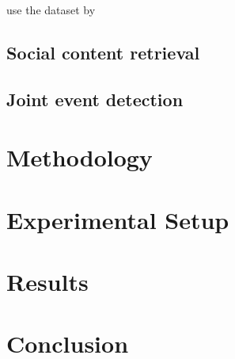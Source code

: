 \cite{zhao_interactive_2019} use the dataset by \cite{guo_linking_2013}
\subsection{Social content retrieval}
\label{Social content retrieval}
\cite{suarez2018data}

\cite{ning_uncovering_2015}

\cite{tanev_enhancing_2012}

\cite{tsagkias_linking_2011}

\cite{danovitch2020linking}

\cite{wang_mining_2015}
\subsection{Joint event detection}
\label{Joint event detection}
\cite{thapen_early_2016}

\cite{hua_topical_2016}

\cite{mele_linking_2017}
\section{Methodology}
\section{Experimental Setup}
\section{Results}
\section{Conclusion}
